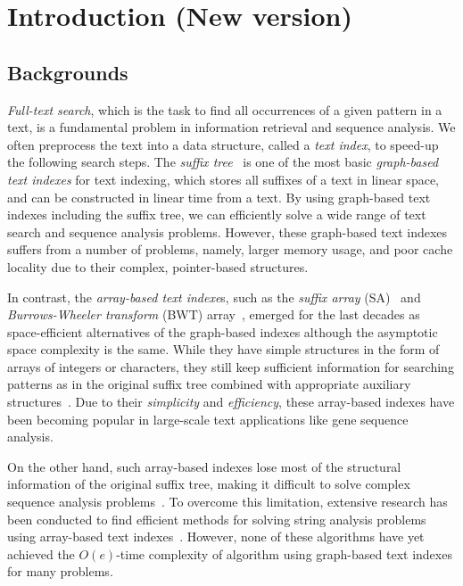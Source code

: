 
\section{Introduction (New version)}

\subsection{Backgrounds}
\textit{Full-text search}, which is the task to find all occurrences of a given pattern in a text, is a fundamental problem in information retrieval and sequence analysis. 
We often preprocess the text into a data structure, called a \textit{text index}, to speed-up the following search steps. 
The \textit{suffix tree}~\cite{weiner1973linear} is one of the most basic \textit{graph-based text indexes} for text indexing, which stores all suffixes of a text in linear space, and can be constructed in linear time from a text. By using graph-based text indexes including the suffix tree, we can efficiently solve a wide range of text search and sequence analysis problems.
However, these graph-based text indexes suffers from a number of problems, namely, larger memory usage, and poor cache locality due to their complex, pointer-based structures.

In contrast, the \textit{array-based text indexe}s, such as the \textit{suffix array} (SA)~\cite{manber:myers1993suffixarrays} and \textit{Burrows-Wheeler transform} (BWT) array~\cite{Ferragina05:FM}, emerged for the last decades as space-efficient alternatives of the graph-based indexes although the asymptotic space complexity is the same. 
While they have simple structures in the form of arrays of integers or characters, they still keep sufficient information for searching patterns as in the original suffix tree combined with appropriate auxiliary structures~\cite{manber:myers1993suffixarrays,Ferragina05:FM}. 
Due to their \textit{simplicity} and \textit{efficiency}, these array-based indexes have been becoming popular in  
large-scale text applications like gene sequence analysis.

On the other hand, such array-based indexes lose most of the structural information of the original suffix tree, making it difficult to solve complex sequence analysis problems~\cite{kasai:lee2001lcp:linear,abouelhoda2004replacing}. To overcome this limitation, extensive research has been conducted to find efficient methods for solving string analysis problems using array-based text indexes~\cite{kasai:lee2001lcp:linear,abouelhoda2004replacing,okanohara2009linear,narisawa2007efficient,beller:berger2012space:efficient:bbo,nishimoto:cpm2021enum}. However, none of these algorithms have yet achieved the $O(e)$-time complexity of algorithm using graph-based text indexes for many problems.

